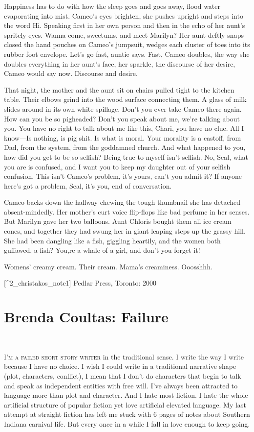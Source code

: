 \documentclass[
]{memoir}
\begin{document}
Happiness has to do with how the sleep goes and goes away, flood water
evaporating into mist. Cameo's eyes brighten, she pushes upright and
steps into the word Hi. Speaking first in her own person and then in the
echo of her aunt's spritely eyes. Wanna come, sweetums, and meet
Marilyn? Her aunt deftly snaps closed the hand pouches on Cameo's
jumpsuit, wedges each cluster of toes into its rubber foot envelope.
Let's go fast, auntie says. Fast, Cameo doubles, the way she doubles
everything in her aunt's face, her sparkle, the discourse of her desire,
Cameo would say now. Discourse and desire.

That night, the mother and the aunt sit on chairs pulled tight to the
kitchen table. Their elbows grind into the wood surface connecting them.
A glass of milk slides around in its own white spillage. Don't you ever
take Cameo there again. How can you be so pigheaded? Don't you speak
about me, we're talking about you. You have no right to talk about me
like this, Chari, you have no clue. All I know---Is nothing, is pig
shit. Is what is moral. Your morality is a castoff, from Dad, from the
system, from the goddamned church. And what happened to you, how did you
get to be so selfish? Being true to myself isn't selfish. No, Seal, what
you are is confused, and I want you to keep my daughter out of your
selfish confusion. This isn't Cameo's problem, it's yours, can't you
admit it? If anyone here's got a problem, Seal, it's you, end of
conversation.

Cameo backs down the hallway chewing the tough thumbnail she has
detached absent-mindedly. Her mother's curt voice flip-flops like bad
perfume in her senses. But Marilyn gave her two balloons. Aunt Chloris
bought them all ice cream cones, and together they had swung her in
giant leaping steps up the grassy hill. She had been dangling like a
fish, giggling heartily, and the women both guffawed, a fish? You‚re a
whale of a girl, and don't you forget it!

Womens' creamy cream. Their cream. Mama's creaminess. Ooosshhh.

{[}\^{}2\_christakos\_note1{]} Pedlar Press, Toronto: 2000

\hypertarget{brenda-coultas-failure}{%
\chapter{Brenda Coultas: Failure}\label{brenda-coultas-failure}}

~

\lettrine[lines=3, findent=0em, nindent=0.1em, lhang=0]{I}{’m a failed short story writer}
in the traditional sense. I write the way I write because I have no
choice. I wish I could write in a traditional narrative shape (plot,
characters, conflict), I mean that I don't do characters that begin to
talk and speak as independent entities with free will. I've always been
attracted to language more than plot and character. And I hate most
fiction. I hate the whole artificial structure of popular fiction yet
love artificial elevated language. My last attempt at straight fiction
has left me stuck with 6 pages of notes about Southern Indiana carnival
life. But every once in a while I fall in love enough to keep going.
\end{document}
